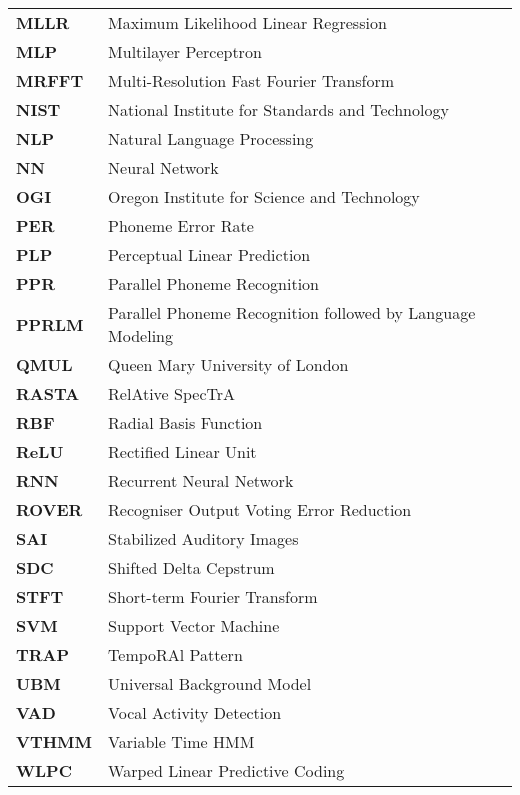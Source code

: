 \begin{longtable}{p{} p{}}
\textbf{MLLR} & Maximum Likelihood Linear Regression\\
\textbf{MLP} & Multilayer Perceptron\\
\textbf{MRFFT} & Multi-Resolution Fast Fourier Transform\\
\textbf{NIST} & National Institute for Standards and Technology\\
\textbf{NLP} & Natural Language Processing\\
\textbf{NN} & Neural Network\\
\textbf{OGI} & Oregon Institute for Science and Technology\\
\textbf{PER} & Phoneme Error Rate\\
\textbf{PLP} & Perceptual Linear Prediction\\
\textbf{PPR} & Parallel Phoneme Recognition\\
\textbf{PPRLM} & Parallel Phoneme Recognition followed by Language Modeling\\
\textbf{QMUL} & Queen Mary University of London\\
\textbf{RASTA} & RelAtive SpecTrA\\
\textbf{RBF} & Radial Basis Function\\
\textbf{ReLU} & Rectified Linear Unit\\
\textbf{RNN} & Recurrent Neural Network\\
\textbf{ROVER} & Recogniser Output Voting Error Reduction\\
\textbf{SAI} & Stabilized Auditory Images\\
\textbf{SDC} & Shifted Delta Cepstrum\\
\textbf{STFT} & Short-term Fourier Transform\\
\textbf{SVM} & Support Vector Machine\\
\textbf{TRAP} & TempoRAl Pattern\\
\textbf{UBM} & Universal Background Model\\
\textbf{VAD} & Vocal Activity Detection\\
\textbf{VTHMM} & Variable Time HMM\\
\textbf{WLPC} & Warped Linear Predictive Coding\\

\end{longtable}
